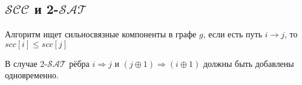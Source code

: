 \subsection{$\mathcal{SCC}$ и 2-$\mathcal{SAT}$}
Алгоритм ищет сильносвязные компоненты в графе $g$, если есть путь $i \rightarrow j$, то $scc[i] \le scc[j]$

В случае 2-$\mathcal{SAT}$ рёбра $i \Rightarrow j$ и $(j\oplus1) \Rightarrow (i \oplus 1)$ должны быть добавлены одновременно.


